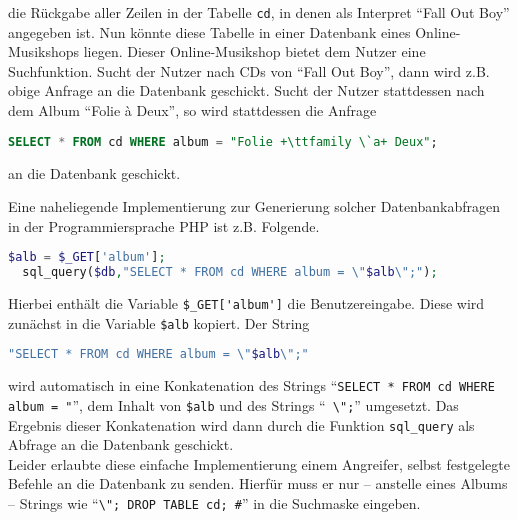die Rückgabe aller Zeilen in der Tabelle \lstinline+cd+, in denen als Interpret "`Fall Out Boy"' angegeben ist.
Nun könnte diese Tabelle in einer Datenbank eines Online-Musikshops liegen. Dieser Online-Musikshop bietet dem Nutzer eine Suchfunktion.
Sucht der Nutzer nach CDs von "`Fall Out Boy"', dann wird z.B. obige Anfrage an die Datenbank geschickt.
Sucht der Nutzer stattdessen nach dem Album "`Folie \`a Deux"', so wird stattdessen die Anfrage 

\begin{lstlisting}[language=SQL,escapechar=+]
  SELECT * FROM cd WHERE album = "Folie +\ttfamily \`a+ Deux";
\end{lstlisting}

an die Datenbank geschickt.

Eine naheliegende Implementierung zur Generierung solcher Datenbankabfragen in der Programmiersprache PHP ist z.B. Folgende.

\begin{lstlisting}[language=PHP]
  $alb = $_GET['album'];
  sql_query($db,"SELECT * FROM cd WHERE album = \"$alb\";");
\end{lstlisting}
\label{listing:impl:SqlInjectionInPhp}

Hierbei enthält die Variable \lstinline+$_GET['album']+ die Benutzereingabe. Diese wird zunächst in die Variable \lstinline+$alb+ kopiert. Der String

\begin{lstlisting}[language=PHP]
	"SELECT * FROM cd WHERE album = \"$alb\";"
\end{lstlisting}

wird automatisch in eine Konkatenation des Strings "`\lstinline+SELECT * FROM cd WHERE album = "+"', dem Inhalt von \lstinline+$alb+  und des Strings "`\lstinline+ \";+"' umgesetzt.
Das Ergebnis dieser Konkatenation wird dann durch die Funktion \lstinline+sql_query+ als Abfrage an die Datenbank geschickt.\\

Leider erlaubte diese einfache Implementierung einem Angreifer, selbst festgelegte Befehle an die Datenbank zu senden. Hierfür muss er nur -- anstelle eines Albums -- Strings wie "`\lstinline+\"; DROP TABLE cd; #+"' in die Suchmaske eingeben.

